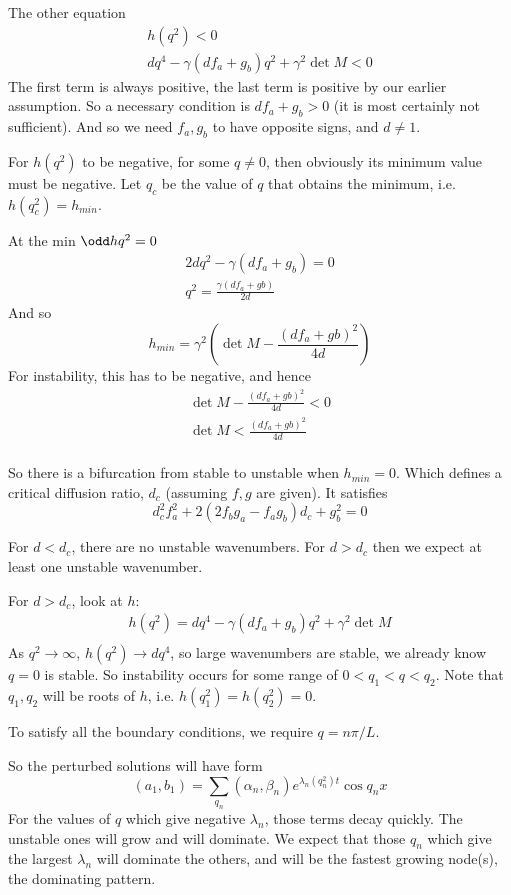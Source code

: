 \documentclass{X:/Documents/Coding/Latex/myassignment}
\begin{document}
The other equation
\begin{align*}
	h(q^2) < 0\\
	dq^4 - \gamma(d f_a+ g_b) q^2 + \gamma^2 \det M < 0
\end{align*}
The first term is always positive, the last term is positive by our earlier assumption.
So a necessary condition is $df_a + g_b > 0$ (it is most certainly not sufficient).
And so we need $f_a,g_b$ to have opposite signs, and $d \neq 1$.


For $h(q^2)$ to be negative, for some $q\neq 0$, then obviously its minimum value must be negative. Let $q_c$ be the value of $q$ that obtains the minimum, i.e. $h(q_c^2) = h_{min}$.

At the min $\odd h{q^2} = 0$
\begin{align*}
	2d q^{2} - \gamma(df_a + g_b) = 0\\
	q^2 = \frac{\gamma(df_a +gb)}{2d}
\end{align*}
And so
\[h_{min} = \gamma^2\left(\det M -  \frac{(df_a +gb)^2}{4d}\right)\]
For instability, this has to be negative, and hence
\begin{align*}
	\det M -  \frac{(df_a +gb)^2}{4d} < 0\\
	\det M <  \frac{(df_a +gb)^2}{4d}\\
\end{align*}

So there is a bifurcation from stable to unstable when $h_{min} =0 $. Which defines a critical diffusion ratio, $d_c$ (assuming $f,g$ are given). It satisfies
\[d_c^2 f_a^2 + 2(2f_bg_a - f_ag_b)d_c + g_b^2 = 0\]

For $d < d_c$, there are no unstable wavenumbers. For $d > d_c$ then we expect at least one unstable wavenumber.

For $d > d_c$, look at $h$:
\begin{align*}
	h(q^2) = dq^4 - \gamma(df_a + g_b) q^2 + \gamma^2 \det M\\
\end{align*}
As $q^2 \to \infty$, $h(q^2) \to dq^4$, so large wavenumbers are stable, we already know $q=0$ is stable. So instability occurs for some range of $0<q_1 < q < q_2$. Note that $q_1,q_2$ will be roots of $h$, i.e. $h(q_1^2) = h(q_2^2) = 0$.

To satisfy all the boundary conditions, we require $q = n\pi/L$.


So the perturbed solutions will have form
\[(a_1,b_1) = \sum_{q_n} (\alpha_n,\beta_n) e^{\lambda_n(q_n^2) t} \cos q_nx \]
For the values of $q$ which give negative $\lambda_n$, those terms decay quickly. The unstable ones will grow and will dominate. We expect that those $q_n$ which give the largest $\lambda_n$ will dominate the others, and will be the fastest growing node(s), the dominating pattern.
\end{document}
